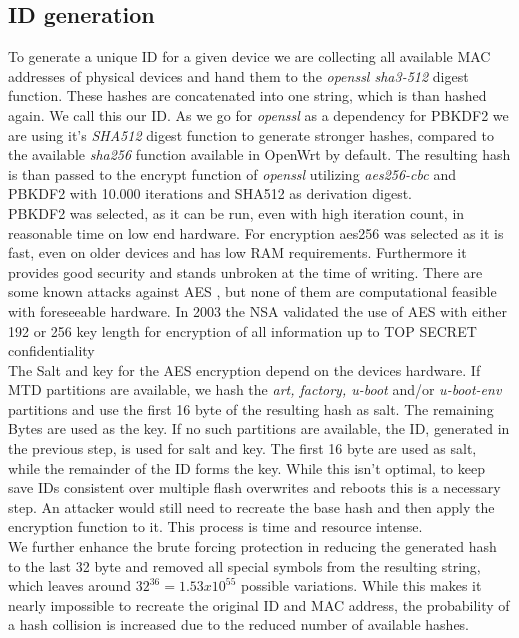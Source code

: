 \subsection{ID generation}
    To generate a unique ID for a given device we are collecting all available MAC addresses of physical devices and hand them to the \textit{openssl sha3-512} digest function. These hashes are concatenated into one string, which is than hashed again. We call this our ID. As we go for \textit{openssl} as a dependency for PBKDF2 we are using it's \textit{SHA512} digest function to generate stronger hashes, compared to the available \textit{sha256} function available in OpenWrt by default. The resulting hash is than passed to the encrypt function of \textit{openssl} utilizing \textit{aes256-cbc} and PBKDF2 with 10.000 iterations and SHA512 as derivation digest.\\
    PBKDF2 was selected, as it can be run, even with high iteration count, in reasonable time on low end hardware\cite{ertaul_implementation_2016}. For encryption aes256 was selected as it is fast, even on older devices and has low RAM requirements. Furthermore it provides good security and stands unbroken at the time of writing. There are some known attacks against AES \cite{schneier_another_2009}\cite{lu_new_2008}\cite{bernstein_cache-timing_nodate}\cite{biryukov_key_2009}, but none of them are computational feasible with foreseeable hardware. In 2003 the NSA validated the use of AES with either 192 or 256 key length for encryption of all information up to TOP SECRET confidentiality\cite{noauthor_national_2003}\\
    
        The Salt and key for the AES encryption depend on the devices hardware. If MTD partitions are available, we hash the \textit{art, factory, u-boot} and/or \textit{u-boot-env} partitions and use the first 16 byte of the resulting hash as salt. The remaining Bytes are used as the key. If no such partitions are available, the ID, generated in the  previous step, is used for salt and key. The first 16 byte are used as salt, while the remainder of the ID forms the key. While this isn't optimal, to keep save IDs consistent over multiple flash overwrites and reboots this is a necessary step. An attacker would still need to recreate the base hash and then apply the encryption function to it. This process is time and resource intense.\\
    
     We further enhance the brute forcing protection in reducing the generated hash to the last 32 byte and removed all special symbols from the resulting string, which leaves around $32^{36} = 1.53x10^{55}$ possible variations. While this makes it nearly impossible to recreate the original ID and MAC address, the probability of a hash collision is increased due to the reduced number of available hashes.\\
    
